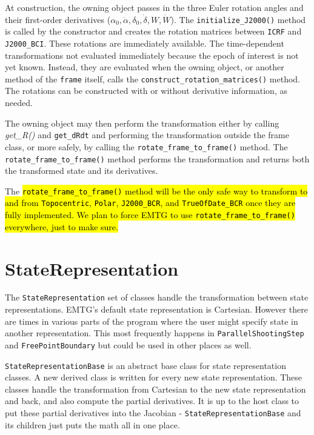 At construction, the owning object passes in the three Euler rotation angles and their first-order derivatives ($\alpha_0, \dot{\alpha}, \delta_0, \dot{\delta}, W, \dot{W}$). The \texttt{initialize\_J2000()} method is called by the constructor and creates the rotation matrices between \texttt{ICRF} and \texttt{J2000\_BCI}. These rotations are immediately available. The time-dependent transformations not evaluated immediately because the epoch of interest is not yet known. Instead, they are evaluated when the owning object, or another method of the \texttt{frame} itself, calls the \texttt{construct\_rotation\_matrices()} method. The rotations can be constructed with or without derivative information, as needed.

The owning object may then perform the transformation either by calling \textit{get\_R()} and \texttt{get\_dRdt} and performing the transformation outside the frame class, or more safely, by calling the \texttt{rotate\_frame\_to\_frame()} method. The \texttt{rotate\_frame\_to\_frame()} method performs the transformation and returns both the transformed state and its derivatives.

The \hl{\texttt{rotate\_frame\_to\_frame()} method will be the only safe way to transform to and from \texttt{Topocentric}, \texttt{Polar}, \texttt{J2000\_BCR}, and \texttt{TrueOfDate\_BCR} once they are fully implemented. We plan to force EMTG to use \texttt{rotate\_frame\_to\_frame()} everywhere, just to make sure.}

\section{StateRepresentation}
\label{sec:StateRepresentation}
The \texttt{StateRepresentation} set of classes handle the transformation between state representations. EMTG's default state representation is Cartesian. However there are times in various parts of the program where the user might specify state in another representation. This most frequently happens in \texttt{ParallelShootingStep} and \texttt{FreePointBoundary} but could be used in other places as well.

\texttt{StateRepresentationBase} is an abstract base class for state representation classes. A new derived class is written for every new state representation. These classes handle the transformation from Cartesian to the new state representation and back, and also compute the partial derivatives. It is up to the host class to put these partial derivatives into the Jacobian - \texttt{StateRepresentationBase} and its children just puts the math all in one place.

